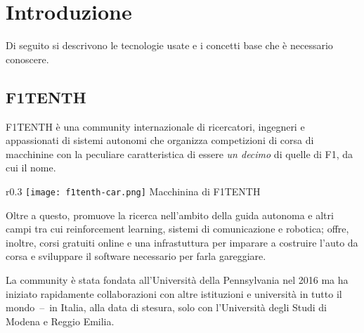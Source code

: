 \chapter{Introduzione}
\label{chap:intro}

Di seguito si descrivono le tecnologie usate e i concetti base che è necessario conoscere.

\section{F1TENTH}
F1TENTH è una community internazionale di ricercatori, ingegneri e appassionati di sistemi autonomi
che organizza competizioni di corsa di macchinine con la peculiare caratteristica
di essere \textit{un decimo} di quelle di F1, da cui il nome.
\begin{wrapfigure}{r}{0.3\textwidth}
	\centering
	\texttt{[image: f1tenth-car.png]}
	{\footnotesize Macchinina di F1TENTH}
\end{wrapfigure}
Oltre a questo, promuove la ricerca nell'ambito della guida autonoma
e altri campi tra cui reinforcement learning, sistemi di comunicazione e robotica;
offre, inoltre, corsi gratuiti online e una infrastuttura per imparare a costruire l'auto da corsa
e sviluppare il software necessario per farla gareggiare. \cite{ftenth-web}

La community è stata fondata all'Università della Pennsylvania nel 2016 ma ha iniziato rapidamente
collaborazioni con altre istituzioni e università in tutto il mondo~--~in Italia, alla data di stesura, solo
con l'Università degli Studi di Modena e Reggio Emilia.

